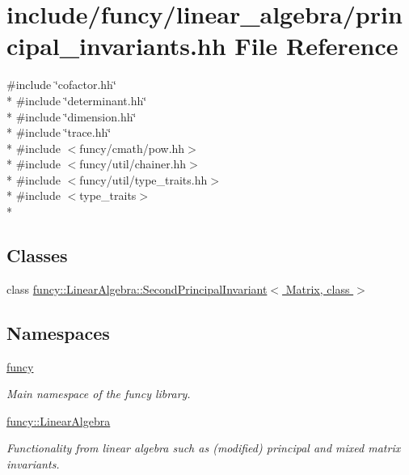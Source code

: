 \hypertarget{principal__invariants_8hh}{\section{include/funcy/linear\-\_\-algebra/principal\-\_\-invariants.hh File Reference}
\label{principal__invariants_8hh}
}
{\ttfamily \#include \char`\"{}cofactor.\-hh\char`\"{}}\\*
{\ttfamily \#include \char`\"{}determinant.\-hh\char`\"{}}\\*
{\ttfamily \#include \char`\"{}dimension.\-hh\char`\"{}}\\*
{\ttfamily \#include \char`\"{}trace.\-hh\char`\"{}}\\*
{\ttfamily \#include $<$funcy/cmath/pow.\-hh$>$}\\*
{\ttfamily \#include $<$funcy/util/chainer.\-hh$>$}\\*
{\ttfamily \#include $<$funcy/util/type\-\_\-traits.\-hh$>$}\\*
{\ttfamily \#include $<$type\-\_\-traits$>$}\\*
\subsection*{Classes}
\begin{DoxyCompactItemize}
\item 
class \hyperlink{classfuncy_1_1LinearAlgebra_1_1SecondPrincipalInvariant}{funcy\-::\-Linear\-Algebra\-::\-Second\-Principal\-Invariant$<$ Matrix, class $>$}
\end{DoxyCompactItemize}
\subsection*{Namespaces}
\begin{DoxyCompactItemize}
\item 
\hyperlink{namespacefuncy}{funcy}
\begin{DoxyCompactList}\small\item\em Main namespace of the funcy library. \end{DoxyCompactList}\item 
\hyperlink{namespacefuncy_1_1LinearAlgebra}{funcy\-::\-Linear\-Algebra}
\begin{DoxyCompactList}\small\item\em Functionality from linear algebra such as (modified) principal and mixed matrix invariants. \end{DoxyCompactList}\end{DoxyCompactItemize}
